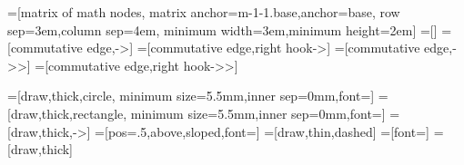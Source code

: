 \usetikzlibrary{calc,arrows,matrix,positioning,shapes.multipart,shapes.geometric}

=[matrix of math nodes,
    matrix anchor=m-1-1.base,anchor=base,
    row sep=3em,column sep=4em,
    minimum width=3em,minimum height=2em]
=[]
=[commutative edge,->]
=[commutative edge,right hook->]
=[commutative edge,->>]
=[commutative edge,right hook->>]

=[draw,thick,circle,
    minimum size=5.5mm,inner sep=0mm,font=\small]
=[draw,thick,rectangle,
    minimum size=5.5mm,inner sep=0mm,font=\small]
=[draw,thick,->]
=[pos=.5,above,sloped,font=\small]
=[draw,thin,dashed]
=[font=\small]
=[draw,thick]

\newcommand\clamp[1]{\raisebox{0pt}[0pt][0pt]{\makebox[0pt][c]{#1}}}
\newcommand\clampwd[1]{\raisebox{0pt}[\height][0pt]{\makebox[0pt][c]{#1}}}
\newcommand\clamphd[1]{\raisebox{0pt}[0pt][0pt]{\makebox[\width][c]{#1}}}



